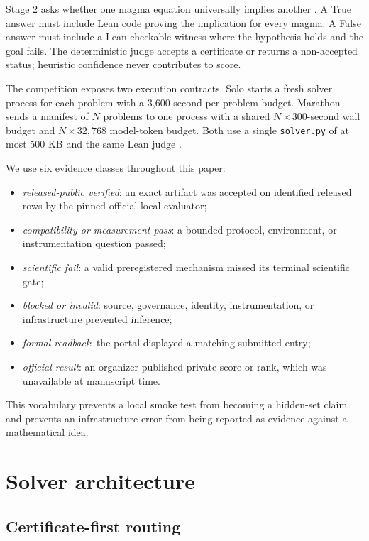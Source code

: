 \documentclass[10pt]{article}
\newcommand{\code}[1]{\texttt{#1}}
\begin{document}
Stage 2 asks whether one magma equation universally implies another \cite{sair2026stage2,equationaltheories2025}. A True answer must include Lean code proving the implication for every magma. A False answer must include a Lean-checkable witness where the hypothesis holds and the goal fails. The deterministic judge accepts a certificate or returns a non-accepted status; heuristic confidence never contributes to score.

The competition exposes two execution contracts. Solo starts a fresh solver process for each problem with a 3,600-second per-problem budget. Marathon sends a manifest of $N$ problems to one process with a shared $N\times300$-second wall budget and $N\times32{,}768$ model-token budget. Both use a single \code{solver.py} of at most 500 KB and the same Lean judge \cite{sairevaluator2026}.

We use six evidence classes throughout this paper:

\begin{itemize}
  \item \emph{released-public verified}: an exact artifact was accepted on identified released rows by the pinned official local evaluator;
  \item \emph{compatibility or measurement pass}: a bounded protocol, environment, or instrumentation question passed;
  \item \emph{scientific fail}: a valid preregistered mechanism missed its terminal scientific gate;
  \item \emph{blocked or invalid}: source, governance, identity, instrumentation, or infrastructure prevented inference;
  \item \emph{formal readback}: the portal displayed a matching submitted entry;
  \item \emph{official result}: an organizer-published private score or rank, which was unavailable at manuscript time.
\end{itemize}

This vocabulary prevents a local smoke test from becoming a hidden-set claim and prevents an infrastructure error from being reported as evidence against a mathematical idea.

\section{Solver architecture}

\subsection{Certificate-first routing}
\end{document}
